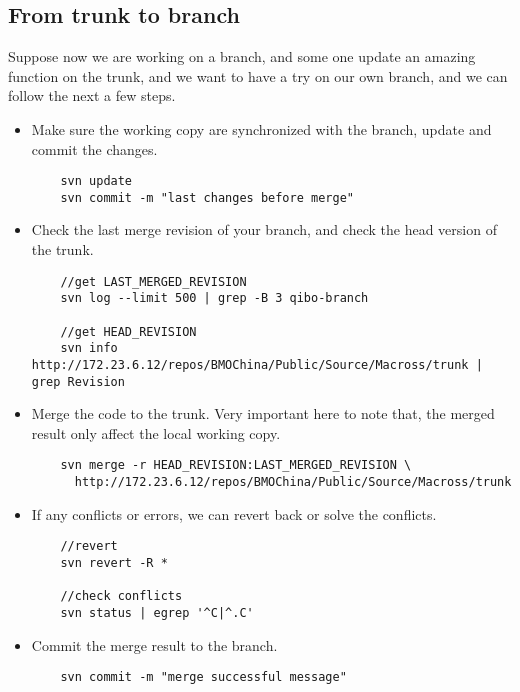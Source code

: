 \subsection{From trunk to branch}
Suppose now we are working on a branch, and some one update an amazing function on the trunk, and we want to have a try on our own branch, and we can follow the next a few steps.

\begin{itemize}
\item
	Make sure the working copy are synchronized with the branch, update and commit the changes.
	\begin{lstlisting}
	svn update 
	svn commit -m "last changes before merge"
	\end{lstlisting}

\item
	Check the last merge revision of your branch, and check the head version of the trunk.
	\begin{lstlisting}
	//get LAST_MERGED_REVISION
	svn log --limit 500 | grep -B 3 qibo-branch
	
	//get HEAD_REVISION 											  
	svn info http://172.23.6.12/repos/BMOChina/Public/Source/Macross/trunk | grep Revision  
	\end{lstlisting}

\item
	Merge the code to the trunk. Very important here to note that, the merged result only affect the local working copy.
	\begin{lstlisting}
	svn merge -r HEAD_REVISION:LAST_MERGED_REVISION \
	  http://172.23.6.12/repos/BMOChina/Public/Source/Macross/trunk
	\end{lstlisting}

\item
	If any conflicts or errors, we can revert back or solve the conflicts.
	\begin{lstlisting}
	//revert	
	svn revert -R *
	
	//check conflicts
	svn status | egrep '^C|^.C'
	\end{lstlisting}

\item
	Commit the merge result to the branch.
	\begin{lstlisting}
	svn commit -m "merge successful message"
	\end{lstlisting}
\end{itemize}







